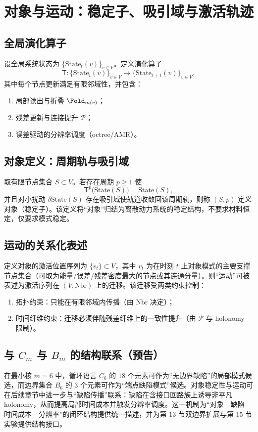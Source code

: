 \section{对象与运动：稳定子、吸引域与激活轨迹}

\subsection{全局演化算子}

设全局系统状态为 $\{\mathrm{State}_t(v)\}_{v\in V}$。定义演化算子
$$
\mathsf T:\{\mathrm{State}_t(v)\}_{v\in V}\mapsto \{\mathrm{State}_{t+1}(v)\}_{v\in V},
$$
其中每个节点更新满足有限邻域性，并包含：
\begin{enumerate}
  \item 局部读出与折叠 $\Fold_{m(v)}$；
  \item 残差更新与连接提升 $\mathcal P$；
  \item 误差驱动的分辨率调度（octree/AMR）。
\end{enumerate}

\subsection{对象定义：周期轨与吸引域}

取有限节点集合 $S\subset V$。若存在周期 $p\ge 1$ 使
$$
\mathsf T^{p}\bigl(\mathrm{State}(S)\bigr)=\mathrm{State}(S),
$$
并且对小扰动 $\delta\mathrm{State}(S)$ 存在吸引域使轨道收敛回该周期轨，则称 $(S,p)$ 定义对象（稳定子）。该定义将“对象”归结为离散动力系统的稳定结构，不要求材料恒定，仅要求模式稳定。

\subsection{运动的关系化表述}

定义对象的激活位置序列为 $\{v_t\}\subset V$，其中 $v_t$ 为在时刻 $t$ 上对象模式的主要支撑节点集合（可取为能量/误差/残差密度最大的节点或其连通分量）。则“运动”可被表述为激活序列在 $(V,\mathrm{Nbr})$ 上的迁移。该迁移受两类约束控制：

\begin{enumerate}
  \item 拓扑约束：只能在有限邻域内传播（由 $\mathrm{Nbr}$ 决定）；
  \item 时间纤维约束：迁移必须伴随残差纤维上的一致性提升（由 $\mathcal P$ 与 holonomy 限制）。
\end{enumerate}

\subsection{\texorpdfstring{与 $C_m$ 与 $B_m$ 的结构联系（预告）}{与 Cm 与 Bm 的结构联系（预告）}}

在最小核 $m=6$ 中，循环语言 $C_6$ 的 $18$ 个元素可作为“无边界缺陷”的局部模式候选，而边界集合 $B_6$ 的 $3$ 个元素可作为“端点缺陷模式”候选。对象稳定性与运动可在后续章节中进一步与“缺陷传播”联系：缺陷在含接口回路族上诱导非平凡 holonomy，从而提高局部时间成本并触发分辨率调度。这一机制为“对象—缺陷—时间成本—分辨率”的闭环结构提供统一描述，并为第 13 节双边界扩展与第 15 节实验提供结构接口。
